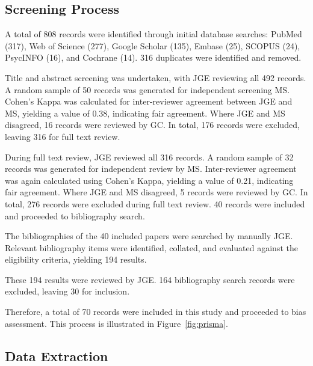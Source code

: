 \begin{appendices}
\subsection{Screening Process}
\label{appendix:screening_results}

A total of 808 records were identified through initial database searches: PubMed (317), Web of Science (277), Google Scholar (135), Embase (25), SCOPUS (24), PsycINFO (16), and Cochrane (14).
316 duplicates were identified and removed.

Title and abstract screening was undertaken, with JGE reviewing all 492 records. A random sample of 50 records was generated for independent screening MS. Cohen's Kappa was calculated for inter-reviewer agreement between JGE and MS, yielding a value of 0.38, indicating fair agreement. Where JGE and MS disagreed, 16 records were reviewed by GC. In total, 176 records were excluded, leaving 316 for full text review. 

During full text review, JGE reviewed all 316 records. A random sample of 32 records was generated for independent review by MS. Inter-reviewer agreement was again calculated using Cohen's Kappa, yielding a value of 0.21, indicating fair agreement. Where JGE and MS disagreed, 5 records were reviewed by GC. In total, 276 records were excluded during full text review. 40 records were included and proceeded to bibliography search. 

The bibliographies of the 40 included papers were searched by manually JGE. Relevant bibliography items were identified, collated, and evaluated against the eligibility criteria, yielding 194 results.

These 194 results were reviewed by JGE. 164 bibliography search records were excluded, leaving 30 for inclusion. 

Therefore, a total of 70 records were included in this study and proceeded to bias assessment. This process is illustrated in Figure~\ref{fig:prisma}.

\subsection{Data Extraction}
\label{appendix:data_extraction}


\end{appendices}

